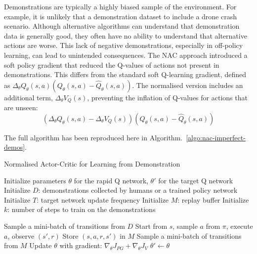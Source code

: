 Demonstrations are typically a highly biased sample of the environment.
For example, it is unlikely that a demonstration dataset to include a drone crash scenario.
Although alternative algorithms can understand that demonstration data is generally good, they often have no ability to understand that alternative actions are worse.
This lack of negative demonstrations, especially in off-policy learning, can lead to unintended consequences.
The NAC approach introduced a soft policy gradient that reduced the Q-values of actions not present in demonstrations.
This differs from the standard soft Q-learning gradient, defined as $ \Delta_{\theta} Q_{\theta}(s, a)(Q_{\theta}(s, a) - \hat{Q}_{\theta}(s, a)) $.
The normalised version includes an additional term, $\Delta_{\theta} V_Q(s)$, preventing the inflation of Q-values for actions that are unseen:
\[ (\Delta_{\theta} Q_{\theta}(s, a) - \Delta_{\theta} V_Q(s))(Q_{\theta}(s, a) - \hat{Q}_{\theta}(s, a))\]

The full algorithm has been reproduced here in Algorithm.~\ref{algo:nac-imperfect-demos}.

\begin{algorithm}
\label{algo:nac-imperfect-demos}
\caption{Normalised Actor-Critic for Learning from Demonstration~\cite{fyp14-rl-imperfect-demos}}
\begin{algorithmic}[1] %
\State Initialize parameters $\theta$ for the rapid Q network, $\theta'$ for the target Q network
\State Initialize $D$: demonstrations collected by humans or a trained policy network
\State Initialize $T$: target network update frequency
\State Initialize $M$: replay buffer
\State Initialize $k$: number of steps to train on the demonstrations

        \State Sample a mini-batch of transitions from $D$
    \Else
        \State Start from $s$, sample $a$ from $\pi$, execute $a$, observe $(s',r)$
        \State Store $(s, a, r, s')$ in $M$
        \State Sample a mini-batch of transitions from $M$
    \EndIf
    \State Update $\theta$ with gradient: $\nabla_\theta J_{PG} + \nabla_\theta J_V$
        \State $\theta' \gets \theta$
    \EndIf
\EndFor
\end{algorithmic}
\end{algorithm}

